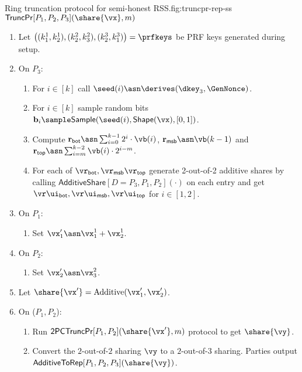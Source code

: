 \begin{Boxfig}{Ring truncation protocol for semi-honest
RSS.}{fig:truncpr-rep-ss}{$\mathsf{TruncPr}{[P_1, P_2, P_3]}(\share{\vx}, m)$}
\begin{enumerate}
  \item Let $\left( (k_1^1, k_2^1), (k_2^2, k_3^2), (k_2^3, k_1^3) \right) = \prfkeys$ be PRF keys generated during setup.
  \item On $P_3$:
  \begin{enumerate}
    \item For $i \in [k]$ call $\seed(i) \asn \derives(\dkey_3, \GenNonce)$.
    \item For $i \in [k]$ sample random bits $\mathbf{b}_i \sample \mathsf{Sample}(\seed(i), \mathsf{Shape}(\vx), [0,1])$.
    \item Compute
    $\mathbf{r}_{\mathsf{bot}} \asn \sum_{i=0}^{k-1}2^i \cdot \vb(i)$,
    $\mathbf{r}_{\mathsf{msb}} \asn \vb(k-1)$ and
    $\mathbf{r}_{\mathsf{top}} \asn \sum_{i=m}^{k-2} \vb(i) \cdot 2^{i-m}$.
    \item For each of $\vr_{\mathsf{bot}}, \vr_{\mathsf{msb}} \vr_{\mathsf{top}}$
    generate 2-out-of-2 additive shares by calling $\mathsf{AdditiveShare}[D=P_3, P_1, P_2](\cdot)$
    on each entry and get $
    \vr\ui_{\mathsf{bot}}, \vr\ui_{\mathsf{msb}}, \vr\ui_{\mathsf{top}}$ for $i \in [1,2]$.
 \end{enumerate}
\item On $P_1$:
\begin{enumerate}
  \item Set $\vx'_1 \asn \vx_1^1 + \vx_2^1$.
\end{enumerate}

\item On $P_2$:
\begin{enumerate}
    \item Set $\vx'_2 \asn \vx_3^2$.
\end{enumerate}
\item Let $\share{\vx'} = \text{Additive}(\vx'_1, \vx'_2)$.

\item On ($P_1, P_2$):
\begin{enumerate}
   \item Run $\textsf{2PCTruncPr}[P_1, P_2](\share{\vx'}, m)$ protocol to get $\share{\vy}$.
  \item Convert the $2$-out-of-$2$ sharing $\vy$ to a $2$-out-of-$3$
 sharing. Parties output $\textsf{AdditiveToRep}[P_1, P_2, P_3](\share{\vy})$.
\end{enumerate}
\end{enumerate}


\end{Boxfig}
